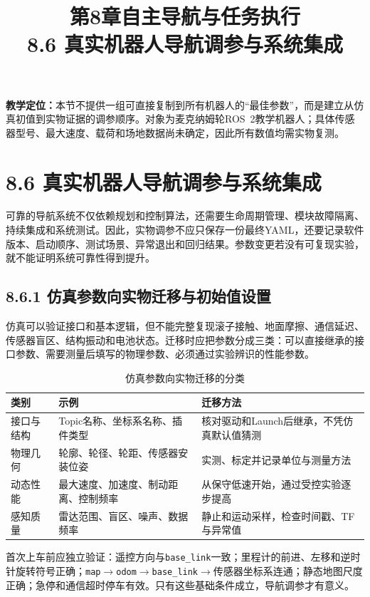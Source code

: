 \documentclass[UTF8,zihao=-4]{ctexart}
\title{第8章自主导航与任务执行\\\large 8.6 真实机器人导航调参与系统集成}
\author{}\date{}
\begin{document}
\maketitle

\noindent\textbf{教学定位：}本节不提供一组可直接复制到所有机器人的“最佳参数”，而是建立从仿真初值到实物证据的调参顺序。对象为麦克纳姆轮ROS~2教学机器人；具体传感器型号、最大速度、载荷和场地数据尚未确定，因此所有数值均需实物复测。

\section*{8.6 真实机器人导航调参与系统集成}

可靠的导航系统不仅依赖规划和控制算法，还需要生命周期管理、模块故障隔离、持续集成和系统测试\cite{macenski2020nav2}。因此，实物调参不应只保存一份最终YAML，还要记录软件版本、启动顺序、测试场景、异常退出和回归结果。参数变更若没有可复现实验，就不能证明系统可靠性得到提升。

\subsection*{8.6.1 仿真参数向实物迁移与初始值设置}

仿真可以验证接口和基本逻辑，但不能完整复现滚子接触、地面摩擦、通信延迟、传感器盲区、结构振动和电池状态。迁移时应把参数分成三类：可以直接继承的接口参数、需要测量后填写的物理参数、必须通过实验辨识的性能参数。

\begin{table}[htbp]
  \centering
  \caption{仿真参数向实物迁移的分类}
  \begin{tabular}{p{}p{}p{}}
    \toprule
    类别 & 示例 & 迁移方法 \\
    \midrule
    接口与结构 & Topic名称、坐标系名称、插件类型 & 核对驱动和Launch后继承，不凭仿真默认值猜测 \\
    物理几何 & 轮廓、轮径、轮距、传感器安装位姿 & 实测、标定并记录单位与测量方法 \\
    动态性能 & 最大速度、加速度、制动距离、控制频率 & 从保守低速开始，通过受控实验逐步提高 \\
    感知质量 & 雷达范围、盲区、噪声、数据频率 & 静止和运动采样，检查时间戳、TF与异常值 \\
    \bottomrule
  \end{tabular}
\end{table}

首次上车前应独立验证：遥控方向与\texttt{base\_link}一致；里程计的前进、左移和逆时针旋转符号正确；\texttt{map}$\rightarrow$\texttt{odom}$\rightarrow$\texttt{base\_link}$\rightarrow$传感器坐标系连通；静态地图尺度正确；急停和通信超时停车有效。只有这些基础条件成立，导航调参才有意义。
\end{document}
